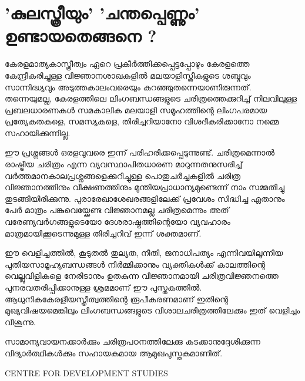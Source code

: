 \newpage
\section*{'കുലസ്ത്രീയും' 'ചന്തപ്പെണ്ണും' ഉണ്ടായതെങ്ങനെ ?}

കേരളമാത്യകാസ്ത്രീത്വം ഏറെ പ്രകീർത്തിക്കപ്പെട്ടപ്പോഴും കേരളത്തെ കേന്ദ്രീകരിച്ചുള്ള വിജ്ഞാനശാഖകളിൽ മലയാളിസ്ത്രീകളുടെ ശബ്ദവും സാന്നിദ്ധ്യവും അടുത്തകാലംവരെയും കുറഞ്ഞുതന്നെയാണിരുന്നത്. തന്നെയുമല്ല, കേരളത്തിലെ ലിംഗബന്ധങ്ങളുടെ ചരിത്രത്തെക്കുറിച്ച് നിലവിലുള്ള പ്രബലധാരണകൾ സമകാലിക മലയാളി സമൂഹത്തിന്റെ ലിംഗപരമായ പ്രത്യേകതകളെ, സമസ്യകളെ, തിരിച്ചറിയാനോ വിശദീകരിക്കാനോ നമ്മെ സഹായിക്കുന്നില്ല.

ഈ പ്രശ്നങ്ങൾ ഒരളവുവരെ ഇന്ന് പരിഹരിക്കപ്പെടുന്നുണ്ട്. ചരിത്രമെന്നാൽ രാഷ്ട്രീയ ചരിത്രം എന്ന വ്യവസ്ഥാപിതധാരണ മാറുന്നതനുസരിച്ച് വർത്തമാനകാലപ്രശ്നങ്ങളെക്കുറിച്ചുള്ള പൊതുചർച്ചകളിൽ ചരിത്ര വിജ്ഞാനത്തിനും വീക്ഷണത്തിനും മുന്തിയപ്രാധാന്യമുണ്ടെന്ന് നാം സമ്മതിച്ചു തുടങ്ങിയിരിക്കുന്നു. പുരാരേഖാശേഖരങ്ങളിലേക്ക് പ്രവേശം സിദ്ധിച്ച ഏതാനും പേർ മാത്രം പങ്കുവെയ്ക്കേണ്ട വിജ്ഞാനമല്ല ചരിത്രമെന്നും അത് വരേണ്യവർഗങ്ങളുടെയോ ദേശരാഷ്ട്രത്തിന്റെയോ വ്യവഹാരം മാത്രമായിക്കൂടെന്നുമുള്ള തിരിച്ചറിവ് ഇന്ന് ശക്തമാണ്.

ഈ വെളിച്ചത്തിൽ, കൂടുതൽ തുല്യത, നീതി, ജനാധിപത്യം എന്നിവയിലൂന്നിയ പുതിയസാമൂഹ്യബന്ധങ്ങൾ നിർമ്മിക്കാനും വ്യക്തികൾക്ക് കാലത്തിന്റെ വെല്ലുവിളികളെ നേരിടാനും ഉതകുന്ന വിജ്ഞാനമായി ചരിത്രവിജ്ഞനത്തെ പുനരവതരിപ്പിക്കാനുള്ള ശ്രമമാണ് ഈ പുസ്തകത്തിൽ. ആധുനികകേരളീയസ്ത്രീത്വത്തിന്റെ രൂപീകരണമാണ് ഇതിന്റെ മുഖ്യവിഷയമെങ്കിലും ലിംഗബന്ധങ്ങളുടെ വിശാലചരിത്രത്തിലേക്കും ഇത് വെളിച്ചം വീശുന്നു.

സാമാന്യവായനക്കാർക്കും ചരിത്രപഠനത്തിലേക്കു കടക്കാനുദ്ദേശിക്കുന്ന വിദ്യാർത്ഥികൾക്കും സഹായകമായ ആമുഖപുസ്തകമാണിത്.
\begin{center}
CENTRE FOR
DEVELOPMENT STUDIES
\end{center}
